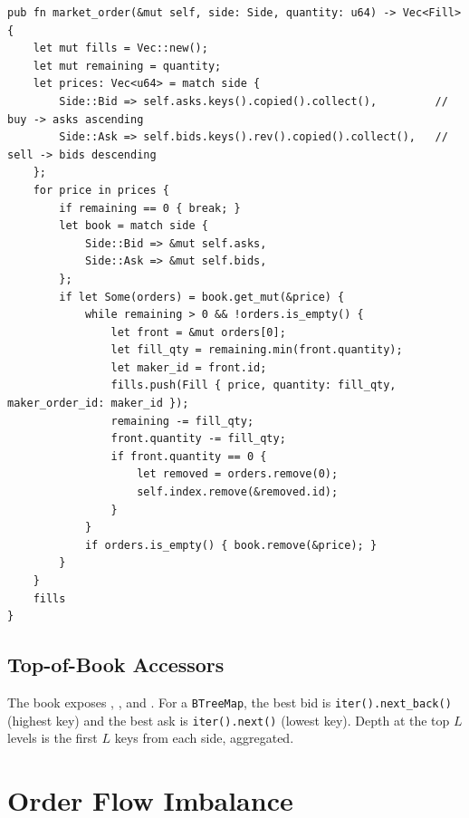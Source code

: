 \begin{lstlisting}[caption={Market-order execution walks the opposite side}]
pub fn market_order(&mut self, side: Side, quantity: u64) -> Vec<Fill> {
    let mut fills = Vec::new();
    let mut remaining = quantity;
    let prices: Vec<u64> = match side {
        Side::Bid => self.asks.keys().copied().collect(),         // buy -> asks ascending
        Side::Ask => self.bids.keys().rev().copied().collect(),   // sell -> bids descending
    };
    for price in prices {
        if remaining == 0 { break; }
        let book = match side {
            Side::Bid => &mut self.asks,
            Side::Ask => &mut self.bids,
        };
        if let Some(orders) = book.get_mut(&price) {
            while remaining > 0 && !orders.is_empty() {
                let front = &mut orders[0];
                let fill_qty = remaining.min(front.quantity);
                let maker_id = front.id;
                fills.push(Fill { price, quantity: fill_qty, maker_order_id: maker_id });
                remaining -= fill_qty;
                front.quantity -= fill_qty;
                if front.quantity == 0 {
                    let removed = orders.remove(0);
                    self.index.remove(&removed.id);
                }
            }
            if orders.is_empty() { book.remove(&price); }
        }
    }
    fills
}
\end{lstlisting}

\subsection{Top-of-Book Accessors}

The book exposes , , 
and . For a \texttt{BTreeMap}, the best bid is
\texttt{iter().next\_back()} (highest key) and the best ask is
\texttt{iter().next()} (lowest key). Depth at the top $L$ levels is
the first $L$ keys from each side, aggregated.

\section{Order Flow Imbalance}


